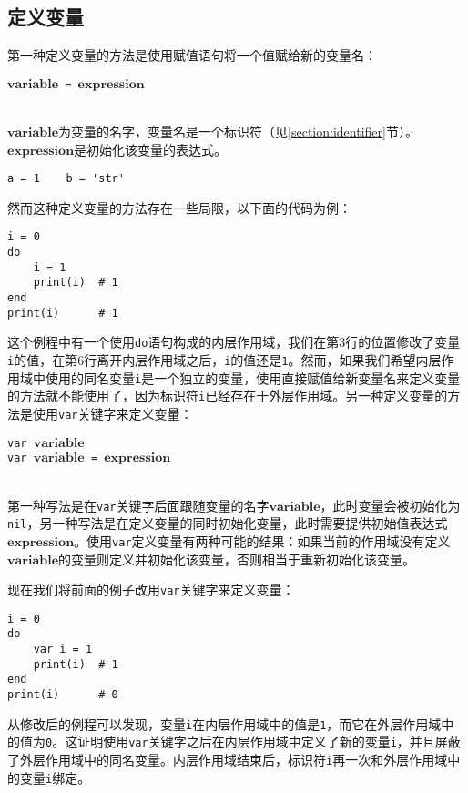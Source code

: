\subsection{定义变量}

第一种定义变量的方法是使用赋值语句将一个值赋给新的变量名：
\begin{algorithm}
$\bm{variable}$\texttt{ = }$\bm{expression}$
\end{algorithm}\vspace{-0.6em}\\
$\bm{variable}$为变量的名字，变量名是一个标识符（见\ref{section:identifier}节）。$\bm{expression}$是初始化该变量的表达式。
\begin{lstlisting}[language=berry, numbers=none]
a = 1    b = 'str'
\end{lstlisting}
然而这种定义变量的方法存在一些局限，以下面的代码为例：
\begin{lstlisting}[language=berry]
i = 0
do
    i = 1
    print(i)  # 1
end
print(i)      # 1
\end{lstlisting}
这个例程中有一个使用\texttt{do}语句构成的内层作用域，我们在第3行的位置修改了变量\texttt{i}的值，在第6行离开内层作用域之后，\texttt{i}的值还是\texttt{1}。然而，如果我们希望内层作用域中使用的同名变量\texttt{i}是一个独立的变量，使用直接赋值给新变量名来定义变量的方法就不能使用了，因为标识符\texttt{i}已经存在于外层作用域。另一种定义变量的方法是使用\texttt{var}关键字来定义变量：
\begin{algorithm}
\texttt{var }$\bm{variable}$ \\
\texttt{var }$\bm{variable}$\texttt{ = }$\bm{expression}$
\end{algorithm}\vspace{-0.6em}\\
第一种写法是在\texttt{var}关键字后面跟随变量的名字$\bm{variable}$，此时变量会被初始化为\texttt{nil}，另一种写法是在定义变量的同时初始化变量，此时需要提供初始值表达式$\bm{expression}$。使用\texttt{var}定义变量有两种可能的结果：如果当前的作用域没有定义$\bm{variable}$的变量则定义并初始化该变量，否则相当于重新初始化该变量。

现在我们将前面的例子改用\texttt{var}关键字来定义变量：
\begin{lstlisting}[language=berry]
i = 0
do
    var i = 1
    print(i)  # 1
end
print(i)      # 0
\end{lstlisting}
从修改后的例程可以发现，变量\texttt{i}在内层作用域中的值是\texttt{1}，而它在外层作用域中的值为\texttt{0}。这证明使用\texttt{var}关键字之后在内层作用域中定义了新的变量\texttt{i}，并且屏蔽了外层作用域中的同名变量。内层作用域结束后，标识符\texttt{i}再一次和外层作用域中的变量\texttt{i}绑定。

